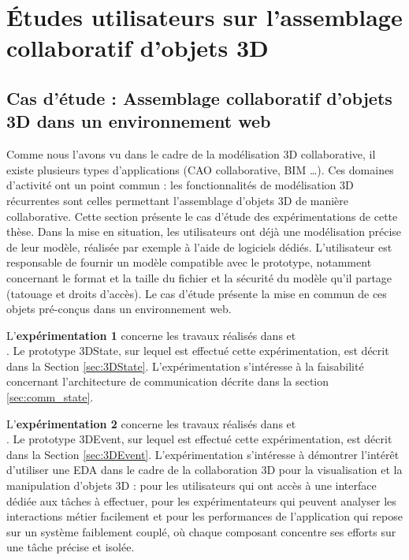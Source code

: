 \chapter{Études utilisateurs sur l'assemblage collaboratif 
d'objets 3D}
\label{sec:chap:expe}
\chaptertable

\section{Cas d'étude : Assemblage collaboratif d'objets 3D dans un 
environnement web}
\label{sec:use_case}
Comme nous l'avons vu dans le cadre de la modélisation \gls{3D} collaborative, il 
existe plusieurs types d'applications (\gls{CAO} collaborative, \gls{BIM} \dots). 
Ces domaines d'activité ont un point commun : les fonctionnalités de 
modélisation \gls{3D} récurrentes sont celles permettant l'assemblage d'objets 
\gls{3D} de manière collaborative. Cette section présente le cas d'étude des 
expérimentations de cette thèse. Dans la mise en situation, les utilisateurs ont 
déjà une modélisation précise de leur modèle,  
réalisée par exemple à l'aide de logiciels dédiés. L'utilisateur est responsable de 
fournir un modèle compatible avec le prototype, notamment concernant le format 
et la taille du fichier et la sécurité du modèle qu'il partage (tatouage et droits 
d'accès). Le cas d'étude présente la mise en commun de ces objets pré-conçus 
dans un environnement web.

L'\textbf{expérimentation 1} concerne les travaux réalisés dans 
\cite{Desprat2015a} et \\ \cite{Desprat2015b}. Le prototype 3DState, sur lequel est 
effectué cette 
expérimentation, est décrit dans la Section \ref{sec:3DState}. L'expérimentation 
s'intéresse à la faisabilité concernant l'architecture 
de communication décrite dans la section \ref{sec:comm_state}. 

 
L'\textbf{expérimentation 2} concerne les travaux réalisés dans 
\cite{Desprat2016} et  \\ 
\cite{Desprat2017}. Le prototype 3DEvent, sur lequel est effectué cette 
expérimentation, est décrit dans la Section \ref{sec:3DEvent}. L'expérimentation 
s'intéresse à démontrer l'intérêt d'utiliser une \gls{EDA} dans le cadre de la 
collaboration 3D pour la visualisation et la manipulation d'objets \gls{3D} : pour les 
utilisateurs qui ont accès à une interface dédiée aux tâches à effectuer, pour les 
expérimentateurs qui peuvent analyser les interactions métier facilement et pour 
les performances de l'application qui repose sur un système faiblement couplé, 
où chaque composant concentre ses efforts sur une tâche précise et isolée. 

